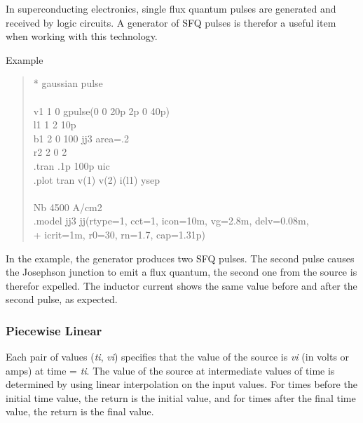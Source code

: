 In superconducting electronics, single flux quantum pulses are
generated and received by logic circuits.  A generator of SFQ pulses
is therefor a useful item when working with this technology.

Example
\begin{quote}\vt
* gaussian pulse\\
\\
v1 1 0 gpulse(0 0 20p 2p 0 40p)\\
l1 1 2 10p\\
b1 2 0 100 jj3 area=.2\\
r2 2 0 2\\
.tran .1p 100p uic\\
.plot tran v(1) v(2) i(l1) ysep\\
\\
\vt * Nb 4500 A/cm2\\
.model jj3 jj(rtype=1, cct=1, icon=10m, vg=2.8m, delv=0.08m,\\
+ icrit=1m, r0=30, rn=1.7, cap=1.31p)
\end{quote}

In the example, the generator produces two SFQ pulses.  The second
pulse causes the Josephson junction to emit a flux quantum, the
second one from the source is therefor expelled.  The inductor
current shows the same value before and after the second pulse,
as expected.

\subsubsection{Piecewise Linear}



Each pair of values ({\it ti\/}, {\it vi\/}) specifies that the value of the
source is {\it vi\/} (in volts or amps) at time = {\it ti\/}.  The
value of the source at intermediate values of time is determined by
using linear interpolation on the input values.  For times before the
initial time value, the return is the initial value, and for times
after the final time value, the return is the final value.

